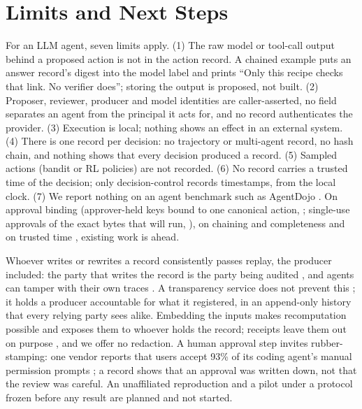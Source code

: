 \documentclass[letterpaper]{article} %
\begin{document}
\section{Limits and Next Steps}
\label{sec:limitations}

For an LLM agent, seven limits apply. (1) The raw model or tool-call output
behind a proposed action is not in the action record. A chained example puts
an answer record's digest into the model label and prints ``Only this recipe
checks that link. No verifier does''; storing the output is proposed, not
built. (2) Proposer, reviewer, producer and model identities are
caller-asserted, no field separates an agent from the principal it acts for,
and no record authenticates the provider. (3) Execution is local; nothing
shows an effect in an external system. (4) There is one record per decision:
no trajectory or multi-agent record, no hash chain, and nothing shows that
every decision produced a record. (5) Sampled actions (bandit or RL
policies) are not recorded. (6) No record carries a trusted time of the
decision; only decision-control records timestamps, from the local clock.
(7) We report nothing on an agent benchmark such as AgentDojo
\citep{debenedetti2024agentdojo}. On approval binding
(approver-held keys bound to one canonical action,
\citealp{schrock2026authorization}; single-use approvals of the exact bytes
that will run, \citealp{jing2026separation}), on chaining and completeness
\citep{sharif2026aat} and on trusted time \citep{ardebili2026novafabric},
existing work is ahead.

Whoever writes or rewrites a record consistently passes replay, the producer
included: the party that writes the record is the party being audited
\citep{figuera2026notarized}, and agents can tamper with their own traces
\citep{qin2026tamper}. A transparency service does not prevent this
\citep{birkholz2026scitt}; it holds a producer accountable for what it
registered, in an append-only history that every relying party sees alike.
Embedding the inputs makes recomputation possible and exposes them to
whoever holds the record; receipts leave them out on purpose
\citep{farley2026acta}, and we offer no redaction. A human approval step
invites rubber-stamping: one vendor reports that users accept 93\% of its
coding agent's manual permission prompts \citep{hughes2026automode}; a
record shows that an approval was written down, not that the review was
careful. An unaffiliated reproduction and a pilot under a protocol frozen
before any result are planned and not started.
\end{document}
